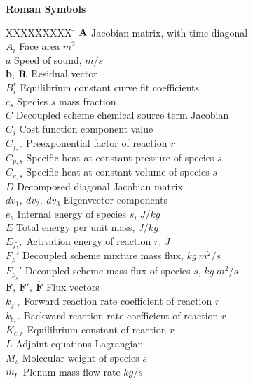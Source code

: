 \begin{nomenclature}


\textbf{Roman Symbols}
\bigskip
\begin{tabbing}
  XXXXXXXXX \= \kill%
  $\mathbf A$ \> Jacobian matrix, with time diagonal \\
  $A_i$ \> Face area $m^2$ \\
  $a$ \> Speed of sound, $m/s$ \\
  $\mathbf{b}$, $\mathbf R_{}$ \> Residual vector \\
  $B^{r}_{i}$ \> Equilibrium constant curve fit coefficients \\
  $c_s$ \> Species $s$ mass fraction \\
  $C$ \> Decoupled scheme chemical source term Jacobian \\
  $C_j$ \> Cost function component value \\
  $C_{f,r}$ \> Preexponential factor of reaction $r$ \\
  $C_{p,s}$ \> Specific heat at constant pressure of species $s$ \\
  $C_{v,s}$ \> Specific heat at constant volume of species $s$ \\
  $D$ \> Decomposed diagonal Jacobian matrix \\
  $dv_1,\ dv_2,\ dv_3$ \> Eigenvector components \\
  $e_s$ \> Internal energy of species $s$, $J/kg$ \\
  $E$ \> Total energy per unit mass, $J/kg$ \\
  $E_{f,r}$\> Activation energy of reaction $r$, $J$ \\
  $F_\rho'$\> Decoupled scheme mixture mass flux, $kg\ m^2/s$ \\
  $F_{\rho_s}'$\> Decoupled scheme mass flux of species $s$, $kg\ m^2/s$ \\
  $\mathbf{F},\ \mathbf{F}',\ \mathbf{\hat{F}}$ \> Flux vectors \\
  $k_{f,r}$ \> Forward reaction rate coefficient of reaction $r$ \\
  $k_{b,r}$ \> Backward reaction rate coefficient of reaction $r$ \\
  $K_{c,r}$ \> Equilibrium constant of reaction $r$ \\
  $L$ \> Adjoint equations Lagrangian \\
  $M_s$ \> Molecular weight of species $s$ \\
  $\dot{m}_p$ \> Plenum mass flow rate $kg/s$ \\

\end{tabbing}
\end{nomenclature}
